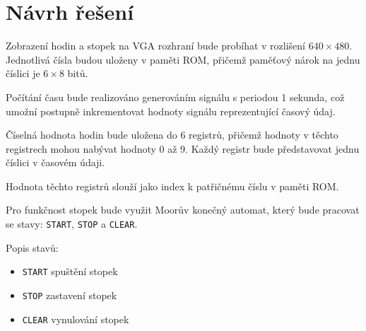 \documentclass[11pt,a4paper]{article}
\begin{document}
  \section{Návrh řešení}

    Zobrazení hodin a stopek na VGA rozhraní bude probíhat v rozlišení
    $640\times480$. Jednotlivá čísla budou uloženy v paměti ROM, přičemž
    paměťový nárok na jednu číslici je $6\times8$ bitů.

    Počítání času bude realizováno generováním signálu s periodou 1 sekunda,
    což umožní postupně inkrementovat hodnoty signálu reprezentující časový
    údaj.

    Číselná hodnota hodin bude uložena do 6 registrů, přičemž hodnoty v těchto
    registrech mohou nabývat hodnoty 0 až 9. Každý registr bude představovat
    jednu číslici v časovém údaji.

    Hodnota těchto registrů slouží jako index k patřičnému číslu v paměti ROM.

    Pro funkčnost stopek bude využit Moorův konečný automat, který bude pracovat se
    stavy: \texttt{START}, \texttt{STOP} a \texttt{CLEAR}.

    Popis stavů:

    \begin{itemize}
      \item \texttt{START} spuštění stopek
      \item \texttt{STOP} zastavení stopek
      \item \texttt{CLEAR} vynulování stopek
    \end{itemize}
\end{document}
